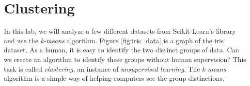 





\section*{Clustering}

In this lab, we will analyze a few different datasets from Scikit-Learn's library and use the \emph{k-means} algorithm. 
Figure \ref{fig:iris_data} is a graph of the iris dataset.
As a human, it is easy to identify the two distinct groups of data.
Can we create an algorithm to identify these groups without human supervision?
This task is called \emph{clustering}, an instance of \emph{unsupervised learning}.
The \emph{k-means} algorithm is a simple way of helping computers see the group distinctions.

